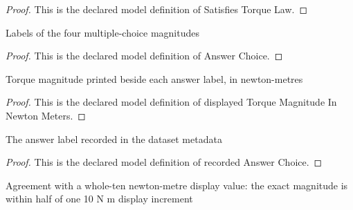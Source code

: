 \begin{proof}
  This is the declared model definition of Satisfies Torque Law.
\end{proof}
\begin{definition}
  \label{def:physics:phyx-mini-0823:phyxminiproblems-problemphyxmini0823-answerchoice}
  Labels of the four multiple-choice magnitudes
\end{definition}
\begin{proof}
  This is the declared model definition of Answer Choice.
\end{proof}
\begin{definition}
  \label{def:physics:phyx-mini-0823:phyxminiproblems-problemphyxmini0823-displayedtorquemagnitudeinnewtonmeters}
  Torque magnitude printed beside each answer label, in newton-metres
\end{definition}
\begin{proof}
  This is the declared model definition of displayed Torque Magnitude In Newton Meters.
\end{proof}
\begin{definition}
  \label{def:physics:phyx-mini-0823:phyxminiproblems-problemphyxmini0823-recordedanswerchoice}
  The answer label recorded in the dataset metadata
\end{definition}
\begin{proof}
  This is the declared model definition of recorded Answer Choice.
\end{proof}
\begin{definition}
  \label{def:physics:phyx-mini-0823:phyxminiproblems-problemphyxmini0823-agreesattennewtonmeterprecision}
  Agreement with a whole-ten newton-metre display value: the exact magnitude is within half of one 10 N m display increment
\end{definition}
